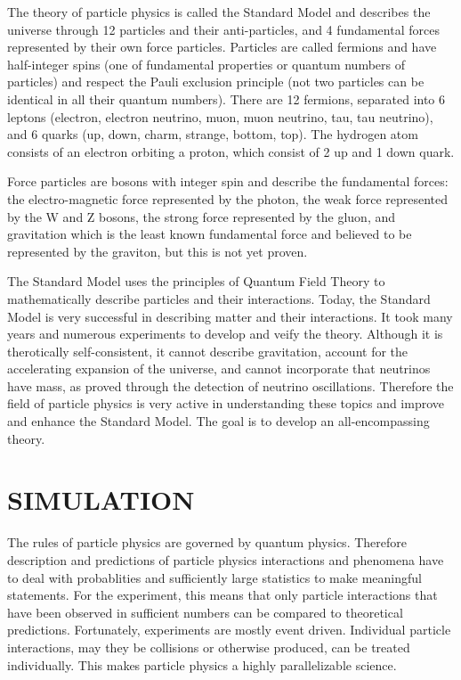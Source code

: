 \documentclass{wscpaperproc}
\theoremstyle{wsc}
\begin{document}
The theory of particle physics is called the Standard Model and describes the universe through 12 particles and their anti-particles, and 4 fundamental forces represented by their own force particles. Particles are called fermions and have half-integer spins (one of fundamental properties or quantum numbers of particles) and respect the Pauli exclusion principle (not two particles can be identical in all their quantum numbers). There are 12 fermions, separated into 6 leptons (electron, electron neutrino, muon, muon neutrino, tau, tau neutrino), and 6 quarks (up, down, charm, strange, bottom, top). The hydrogen atom consists of an electron orbiting a proton, which consist of 2 up and 1 down quark.

Force particles are bosons with integer spin and describe the fundamental forces: the electro-magnetic force represented by the photon, the weak force represented by the W and Z bosons, the strong force represented by the gluon, and gravitation which is the least known fundamental force and believed to be represented by the graviton, but this is not yet proven.

The Standard Model uses the principles of Quantum Field Theory to mathematically describe particles and their interactions. Today, the Standard Model is very successful in describing matter and their interactions. It took many years and numerous experiments to develop and veify the theory. Although it is therotically self-consistent, it cannot describe gravitation, account for the accelerating expansion of the universe, and cannot incorporate that neutrinos have mass, as proved through the detection of neutrino oscillations. Therefore the field of particle physics is very active in understanding these topics and improve and enhance the Standard Model. The goal is to develop an all-encompassing theory.

\section{SIMULATION}
\label{sec:simulation}

The rules of particle physics are governed by quantum physics. Therefore description and predictions of particle physics interactions and phenomena have to deal with probablities and sufficiently large statistics to make meaningful statements. For the experiment, this means that only particle interactions that have been observed in sufficient numbers can be compared to theoretical predictions. Fortunately, experiments are mostly event driven. Individual particle interactions, may they be collisions or otherwise produced, can be treated individually. This makes particle physics a highly parallelizable science.
\end{document}
